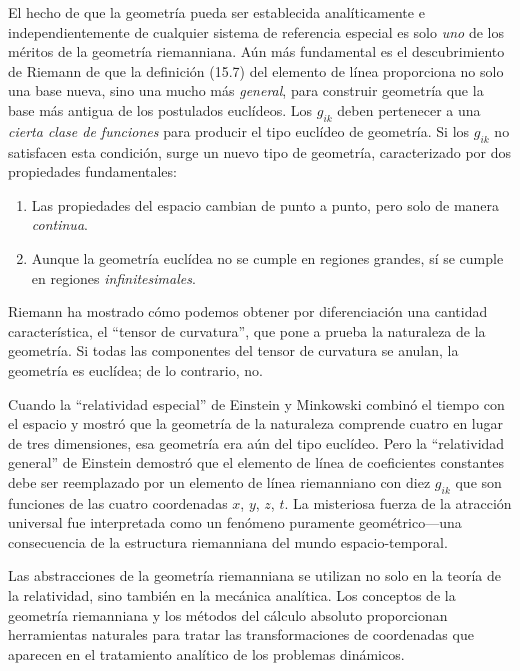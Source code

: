 \documentclass[12pt,a4paper]{book}
\begin{document}
\begin{center}
El hecho de que la geometr\'ia pueda ser establecida anal\'iticamente e independientemente de cualquier sistema de referencia especial es solo \textit{uno} de los m\'eritos de la geometr\'ia riemanniana. A\'un m\'as fundamental es el descubrimiento de Riemann de que la definici\'on (15.7) del elemento de l\'inea proporciona no solo una base nueva, sino una mucho m\'as \textit{general}, para construir geometr\'ia que la base m\'as antigua de los postulados eucl\'ideos. Los $g_{ik}$ deben pertenecer a una \textit{cierta clase de funciones} para producir el tipo eucl\'ideo de geometr\'ia. Si los $g_{ik}$ no satisfacen esta condici\'on, surge un nuevo tipo de geometr\'ia, caracterizado por dos propiedades fundamentales:

\begin{enumerate}
\item Las propiedades del espacio cambian de punto a punto, pero solo de manera \textit{continua}.

\item Aunque la geometr\'ia eucl\'idea no se cumple en regiones grandes, s\'i se cumple en regiones \textit{infinitesimales}.
\end{enumerate}

Riemann ha mostrado c\'omo podemos obtener por diferenciaci\'on una cantidad caracter\'istica, el ``tensor de curvatura'', que pone a prueba la naturaleza de la geometr\'ia. Si todas las componentes del tensor de curvatura se anulan, la geometr\'ia es eucl\'idea; de lo contrario, no.

Cuando la ``relatividad especial'' de Einstein y Minkowski combin\'o el tiempo con el espacio y mostr\'o que la geometr\'ia de la naturaleza comprende cuatro en lugar de tres dimensiones, esa geometr\'ia era a\'un del tipo eucl\'ideo. Pero la ``relatividad general'' de Einstein demostr\'o que el elemento de l\'inea de coeficientes constantes debe ser reemplazado por un elemento de l\'inea riemanniano con diez $g_{ik}$ que son funciones de las cuatro coordenadas $x$, $y$, $z$, $t$. La misteriosa fuerza de la atracci\'on universal fue interpretada como un fen\'omeno puramente geom\'etrico---una consecuencia de la estructura riemanniana del mundo espacio-temporal.

Las abstracciones de la geometr\'ia riemanniana se utilizan no solo en la teor\'ia de la relatividad, sino tambi\'en en la mec\'anica anal\'itica. Los conceptos de la geometr\'ia riemanniana y los m\'etodos del c\'alculo absoluto proporcionan herramientas naturales para tratar las transformaciones de coordenadas que aparecen en el tratamiento anal\'itico de los problemas din\'amicos.


\end{center}
\end{document}
